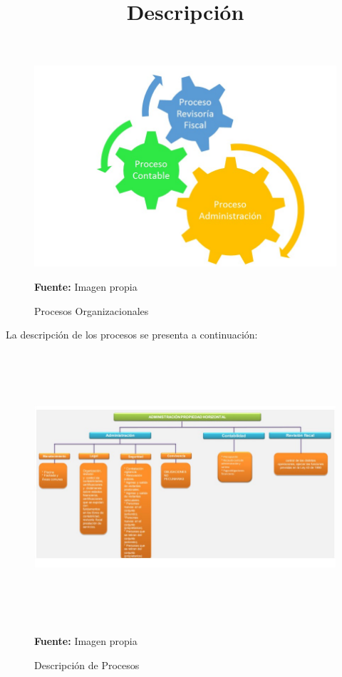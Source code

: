 \begin{figure}[h!]
	\centering
	\includegraphics[width=0.7\linewidth]{arquitectura/organizacion/imgs/procesos_org1}
	\caption{Procesos Organizacionales} {\scriptsize \textbf{Fuente:} Imagen propia}
\end{figure}

\vspace{7cm}

\title{Descripción}

La descripción de los procesos se presenta a continuación:

\begin{figure}[h!]
	\centering
	\includegraphics[width=16cm,height=10cm]{arquitectura/organizacion/imgs/procesos_org2}
	\caption{Descripción de Procesos} {\scriptsize \textbf{Fuente:} Imagen propia}	
\end{figure}

